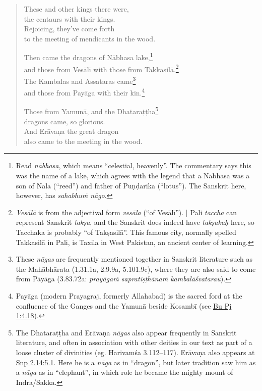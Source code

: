 \documentclass[12pt,openany]{book}%
\begin{document}
\begin{verse}
These and other kings there were, \\
the centaurs with their kings. \\
Rejoicing, they’ve come forth \\
to the meeting of mendicants in the wood. 

Then came the dragons of \textsanskrit{Nābhasa} lake,\footnote{Read \textit{\textsanskrit{nābhasa}}, which means “celestial, heavenly”. The commentary says this was the name of a lake, which agrees with the legend that a \textsanskrit{Nābhasa} was a son of Nala (“reed”) and father of \textsanskrit{Puṇḍarīka} (“lotus”). The Sanskrit here, however, has \textit{\textsanskrit{sahabhuṁ} \textsanskrit{nāgo}}. } \\
and those from \textsanskrit{Vesālī} with those from \textsanskrit{Takkasilā}.\footnote{\textit{\textsanskrit{Vesālā}} is from the adjectival form \textit{\textsanskrit{vesāla}} (“of \textsanskrit{Vesālī}”). | Pali \textit{taccha} can represent Sanskrit \textit{\textsanskrit{takṣa}}, and the Sanskrit does indeed have \textit{\textsanskrit{takṣakaḥ}} here, so Tacchaka is probably “of \textsanskrit{Takṣasilā}”. This famous city, normally spelled \textsanskrit{Takkasilā} in Pali, is Taxila in West Pakistan, an ancient center of learning. } \\
The Kambalas and Assataras came\footnote{These \textit{\textsanskrit{nāgas}} are frequently mentioned together in Sanskrit literature such as the \textsanskrit{Mahābhārata} (1.31.1a, 2.9.9a, 5.101.9c), where they are also said to come from \textsanskrit{Pāyāga} (3.83.72a: \textit{\textsanskrit{prayāgaṁ} \textsanskrit{sapratiṣṭhānaṁ} \textsanskrit{kambalāśvatarau}}). } \\
and those from \textsanskrit{Payāga} with their kin.\footnote{\textsanskrit{Payāga} (modern Prayagraj, formerly Allahabad) is the sacred ford at the confluence of the Ganges and the \textsanskrit{Yamunā} beside \textsanskrit{Kosambī} (see \href{https://suttacentral.net/pli-tv-bu-vb-pj1/en/sujato\#4.18}{Bu Pj 1:4.18}). } 

Those from \textsanskrit{Yamunā}, and the \textsanskrit{Dhataraṭṭha}\footnote{The \textsanskrit{Dhataraṭṭha} and \textsanskrit{Erāvaṇa} \textit{\textsanskrit{nāgas}} also appear frequently in Sanskrit literature, and often in association with other deities in our text as part of a loose cluster of divinities (eg. \textsanskrit{Harivamśa} 3.112–117). \textsanskrit{Erāvaṇa} also appears at \href{https://suttacentral.net/snp2.14/en/sujato\#5.1}{Snp 2.14:5.1}. Here he is a \textit{\textsanskrit{nāga}} as in “dragon”, but later tradition saw him as a \textit{\textsanskrit{nāga}} as in “elephant”, in which role he became the mighty mount of Indra/Sakka. } \\
dragons came, so glorious. \\
And \textsanskrit{Erāvaṇa} the great dragon \\
also came to the meeting in the wood. 


\end{verse}
\end{document}
